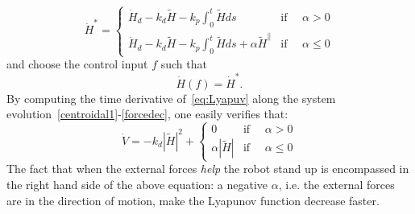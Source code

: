 \begin{equation}
\label{eq:newHStarDot}
  \dot{H}^* =
  \begin{cases}
    \dot{H}_d - k_d\tilde{H} -k_p \int_0^t\tilde{H} ds & \text{if }\quad  \alpha > 0
    \\
   \dot{H}_d - k_d\tilde{H} -k_p \int_0^t\tilde{H} ds +\alpha\tilde{H}^\parallel & \text{if }\quad  \alpha \leq 0
  \end{cases}
\end{equation}
and choose the control input $f$ such that 
\[ \dot{H}(f) = \dot{H}^*. \]
By computing the time derivative of~\eqref{eq:Lyapuv} along the system evolution~\eqref{centroidal1}-\eqref{forcedec}, one easily verifies that:
\begin{equation}
\label{eq:newHStarDot}
 \dot{V} =-k_d|\tilde{H}|^2 +
  \begin{cases}
   0 & \text{if }\quad  \alpha > 0
    \\
   \alpha|\tilde{H}| & \text{if }\quad  \alpha \leq 0
  \end{cases}
\end{equation}
The fact that when the external forces \emph{help} the robot stand up is encompassed in the right hand side of the above equation:  a negative $\alpha$, i.e. the external forces are in the direction of motion, make the Lyapunov function decrease faster.